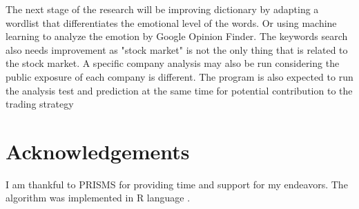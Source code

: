 \documentclass[a0,landscape]{a0poster}\usepackage[]{graphicx}\usepackage[]{color}
\begin{document}
\begin{multicols}{4}
The next stage of the research will be improving dictionary by adapting a wordlist that differentiates the emotional level of the words. Or using machine learning to analyze the emotion by Google Opinion Finder. The keywords search also needs improvement as "stock market" is not the only thing that is related to the stock market. A specific company analysis may also be run considering the public exposure of each company is different. 
The program is also expected to run the analysis test and prediction at the same time for potential contribution to the trading strategy



\nocite{*} %


\section*{Acknowledgements}

I am thankful to PRISMS for providing time and support for my endeavors. The algorithm was implemented in R language \cite{Rlang}.

\end{multicols}
\end{document}
